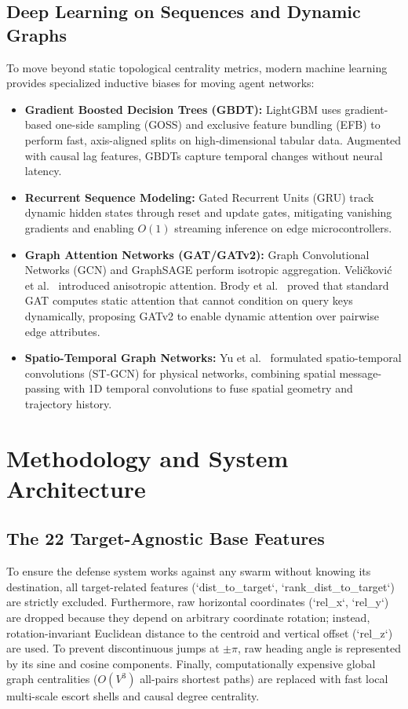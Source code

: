 \documentclass[9pt]{ieeeconf}
\begin{document}
\subsection{Deep Learning on Sequences and Dynamic Graphs}
To move beyond static topological centrality metrics, modern machine learning provides specialized inductive biases for moving agent networks:
\begin{itemize}
    \item \textbf{Gradient Boosted Decision Trees (GBDT):} LightGBM \cite{ke2017lightgbm} uses gradient-based one-side sampling (GOSS) and exclusive feature bundling (EFB) to perform fast, axis-aligned splits on high-dimensional tabular data. Augmented with causal lag features, GBDTs capture temporal changes without neural latency.
    \item \textbf{Recurrent Sequence Modeling:} Gated Recurrent Units (GRU) \cite{cho2014learning} track dynamic hidden states through reset and update gates, mitigating vanishing gradients and enabling $O(1)$ streaming inference on edge microcontrollers.
    \item \textbf{Graph Attention Networks (GAT/GATv2):} Graph Convolutional Networks (GCN) \cite{kipf2017semi} and GraphSAGE \cite{hamilton2017inductive} perform isotropic aggregation. Veli\v{c}kovi\'{c} et al.\ \cite{velickovic2018graph} introduced anisotropic attention. Brody et al.\ \cite{brody2022how} proved that standard GAT computes static attention that cannot condition on query keys dynamically, proposing GATv2 to enable dynamic attention over pairwise edge attributes.
    \item \textbf{Spatio-Temporal Graph Networks:} Yu et al.\ \cite{yu2018spatio} formulated spatio-temporal convolutions (ST-GCN) for physical networks, combining spatial message-passing with 1D temporal convolutions to fuse spatial geometry and trajectory history.
\end{itemize}

\section{Methodology and System Architecture}
\label{sec:methodology}

\subsection{The 22 Target-Agnostic Base Features}
To ensure the defense system works against any swarm without knowing its destination, all target-related features (`dist\_to\_target`, `rank\_dist\_to\_target`) are strictly excluded. Furthermore, raw horizontal coordinates (`rel_x`, `rel_y`) are dropped because they depend on arbitrary coordinate rotation; instead, rotation-invariant Euclidean distance to the centroid and vertical offset (`rel_z`) are used. To prevent discontinuous jumps at $\pm\pi$, raw heading angle is represented by its sine and cosine components. Finally, computationally expensive global graph centralities ($O(V^3)$ all-pairs shortest paths) are replaced with fast local multi-scale escort shells and causal degree centrality.
\end{document}
